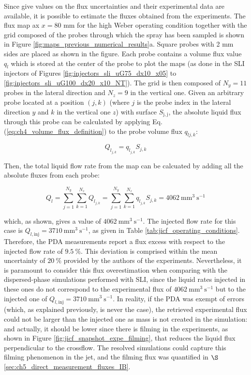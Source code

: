 Since  give values on the flux uncertainties and their experimental data are available, it is possible to estimate the fluxes obtained from the experiments. The flux map ax $x = 80$ mm for the high Weber operating condition together with the grid composed of the probes through which the spray has been sampled is shown in Figure \ref{fig:maps_previous_numerical_results}a. Square probes with 2 mm sides are placed as shown in the figure. Each probe contains a volume flux value $q_l$ which is stored at the center of the probe to plot the maps (as done in the SLI injectors of Figures 
\ref{fig:injectors_sli_uG75_dx10_x05} to \ref{fig:injectors_sli_uG100_dx20_x10_NT}). The grid is then composed of $N_y = 11$ probes in the lateral direction and $N_z = 9$ in the vertical one. Given an arbitrary probe located at a position $\left( j,k \right)$ (where $j$ is the probe index in the lateral direction $y$ and $k$ in the vertical one $z$) with surface $S_\mathrm{j,j}$, the absolute liquid flux through this probe can be calculated by applying Eq. (\ref{eq:ch4_volume_flux_definition}) to the probe volume flux $q_{l{j,k}}$:

\begin{equation}
Q_{l_{j,k}} = q_{l_{j,k}} S_{j,k}
\end{equation}

Then, the total liquid flow rate from the map can be calcuated by adding all the absolute fluxes from each probe:

\begin{equation}
\label{eq:ch6_Ql_total_estimation_from_flux_profiles}
Q_{l} = \sum_{j=1}^{N_y} \sum_{k=1}^{N_z} Q_{l_{j,k}} = \sum_{j=1}^{N_y} \sum_{k=1}^{N_z} q_{l_{j,k}} S_{j,k} = 4062 ~ \mathrm{mm}^3~\mathrm{s}^{-1}
\end{equation}

which, as shown, gives a value of $4062 ~ \mathrm{mm}^3~\mathrm{s}^{-1}$. The injected flow rate for this case is $Q_{l,\mathrm{inj}} = 3710~ \mathrm{mm}^3~\mathrm{s}^{-1}$, as given in Table \ref{tab:jicf_operating_conditions}. Therefore, the PDA measurements report a flux excess with respect to the injected flow rate of $9.5~\%$. This deviation is comprised within the mean uncertainty of $20~\%$ provided by the authors of the experiments. Nevertheless, it is paramount to consider this flux overestimation when comparing with the dispersed-phase simulations performed with SLI, since the liquid rates injected in these ones do not correspond to the experimental flux of $4062 ~ \mathrm{mm}^3~\mathrm{s}^{-1}$ but to the injected one of $Q_{l,\mathrm{inj}} = 3710~ \mathrm{mm}^3~\mathrm{s}^{-1}$. In reality, if the PDA was exempt of errors (which, as explained previously, is never the case), the retrieved experimental flux could not be larger than the injected one as mass is not created in the simulation: and actually, it should be lower since there is filming in the experiments, as shown in Figure \ref{fig:jicf_snapshot_expe_filming}, that reduces the liquid flux perpendicular to the crossflow. The resolved simulations could capture this filming phenomenon in the jet, and the filming flux was quantified in $\S$\ref{sec:ch5_direct_measurement_fluxes_IB}.


